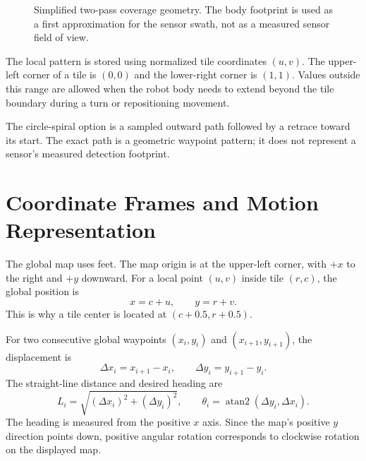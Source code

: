 \documentclass{article}
\begin{document}
\begin{figure}[H]
\centering
{}
\caption{Simplified two-pass coverage geometry. The body footprint is used as a first approximation for the sensor swath, not as a measured sensor field of view.}
\end{figure}

The local pattern is stored using normalized tile coordinates $(u,v)$. The upper-left corner of a tile is $(0,0)$ and the lower-right corner is $(1,1)$. Values outside this range are allowed when the robot body needs to extend beyond the tile boundary during a turn or repositioning movement.

The circle-spiral option is a sampled outward path followed by a retrace toward its start. The exact path is a geometric waypoint pattern; it does not represent a sensor's measured detection footprint.

\section{Coordinate Frames and Motion Representation}

The global map uses feet. The map origin is at the upper-left corner, with $+x$ to the right and $+y$ downward. For a local point $(u,v)$ inside tile $(r,c)$, the global position is
\[
x=c+u,\qquad y=r+v.
\]
This is why a tile center is located at $(c+0.5,r+0.5)$.

For two consecutive global waypoints $(x_i,y_i)$ and $(x_{i+1},y_{i+1})$, the displacement is
\[
\Delta x_i=x_{i+1}-x_i,\qquad
\Delta y_i=y_{i+1}-y_i.
\]
The straight-line distance and desired heading are
\[
L_i=\sqrt{(\Delta x_i)^2+(\Delta y_i)^2},
\qquad
\theta_i=\operatorname{atan2}(\Delta y_i,\Delta x_i).
\]
The heading is measured from the positive $x$ axis. Since the map's positive $y$ direction points down, positive angular rotation corresponds to clockwise rotation on the displayed map.
\end{document}
